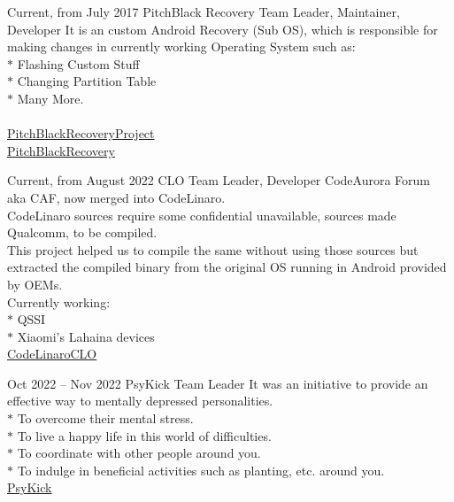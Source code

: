 \documentclass[
	10pt, %
	]{FreemanCV}
\begin{document}
\begin{paracol}{2}


\jobentry
	{Current, from July 2017} %
	{} %
	{PitchBlack Recovery} %
	{Team Leader, Maintainer, Developer} %
	{It is an custom Android Recovery (Sub OS), which is responsible for making changes in currently working Operating System such as:\\
	 $*$ Flashing Custom Stuff\\
	 $*$ Changing Partition Table\\
	 $*$ Many More.\\
	 \\
	\raisebox{-1pt}{\faGithubSquare} \href{https://github.com/PitchBlackRecoveryProject}{PitchBlackRecoveryProject}\\
	\raisebox{-1pt}{\faGlobe} \href{https://pitchblackrecovery.com}{PitchBlackRecovery}} %


\jobentry
	{Current, from August 2022} %
	{} %
	{CLO} %
	{Team Leader, Developer} %
	{CodeAurora Forum aka CAF, now merged into CodeLinaro. \\
	CodeLinaro sources require some confidential unavailable, sources made Qualcomm, to be compiled. \\
	This project helped us to compile the same without using those sources but extracted the compiled binary from the original OS running in Android provided by OEMs. \\
	Currently working:\\
	 $*$ QSSI\\
	 $*$ Xiaomi's Lahaina devices\\
	\raisebox{-1pt}{\faGithubSquare} \href{https://github.com/CodeLinaroCLO}{CodeLinaroCLO}} %



\jobentry
	{Oct 2022 -- Nov 2022} %
	{} %
	{PsyKick} %
	{Team Leader} %
	{It was an initiative to provide an effective way to mentally depressed personalities.\\
	 $*$ To overcome their mental stress.\\
	 $*$ To live a happy life in this world of difficulties.\\
	 $*$ To coordinate with other people around you.\\
	 $*$ To indulge in beneficial activities such as planting, etc. around you.\\
	 \raisebox{-1pt}{\faGithubSquare} \href{https://github.com/PsyKick-MIT}{PsyKick}} %


\end{paracol}
\end{document}
